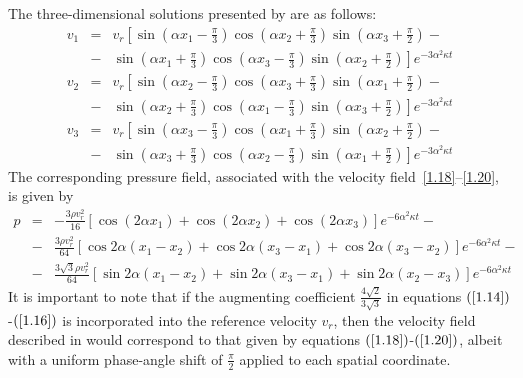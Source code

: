 \documentclass[11pt]{jfm}
\numberwithin{equation}{section}
\begin{document}
The three-dimensional solutions presented by \cite{tha4} are as follows:
\begin{eqnarray}
\label{1.18}
v_1& = &{v_r}\left[\sin { \left(\alpha x_1-\frac{\pi}{3} \right) } \cos {\left(\alpha x_2+\frac{\pi}{3}\right) }\sin { \left(\alpha x_3+\frac{\pi}{2}\right) }\right.- \nonumber\\
&-&\left.\sin  {\left( \alpha x_1+\frac{\pi}{3}\right) } \cos  { \left(\alpha x_3-\frac{\pi}{3} \right) } \sin  {\left( \alpha x_2+\frac{\pi}{2}\right) }\right]e^{ - 3\alpha ^2 \kappa t}
\end{eqnarray}
\begin{eqnarray}
\label{1.19}
v_2 & = &{v_r}\left[\sin { \left(\alpha x_2-\frac{\pi}{3} \right) } \cos {\left(\alpha x_3+\frac{\pi}{3}\right) }\sin { \left(\alpha x_1+\frac{\pi}{2}\right) }\right.- \nonumber\\
&-&\left.\sin  {\left( \alpha x_2+\frac{\pi}{3}\right) } \cos  { \left(\alpha x_1-\frac{\pi}{3} \right) } \sin  {\left( \alpha x_3+\frac{\pi}{2}\right) }\right]e^{ - 3\alpha ^2 \kappa t}
\end{eqnarray}
\begin{eqnarray}
\label{1.20}
v_3 &=&{v_r}\left[ \sin { \left(\alpha x_3-\frac{\pi}{3} \right) } \cos {\left(\alpha x_1+\frac{\pi}{3}\right) }\sin { \left(\alpha x_2+\frac{\pi}{2}\right) }\right.- \nonumber\\
&-&\left.\sin  {\left( \alpha x_3+\frac{\pi}{3}\right) } \cos  { \left(\alpha x_2-\frac{\pi}{3} \right) } \sin  {\left( \alpha x_1+\frac{\pi}{2}\right) }\right]e^{ - 3\alpha ^2 \kappa t}
\end{eqnarray}
The corresponding pressure field, associated with the velocity field~\eqref{1.18}--\eqref{1.20}, is given by
\begin{eqnarray}
\label{1.21}
p&=&-\frac{3\rho {v_r^2} }{16}\left[\cos\left(2\alpha x_1 \right)+\cos\left(2\alpha x_2 \right)+\cos\left(2\alpha x_3 \right)\right]e^{ - 6\alpha ^2 \kappa t}- \nonumber\\
&-&\frac{3\rho{v_r^2}}{64}\left[\cos 2\alpha\left(x_1-x_2\right)+\cos 2\alpha\left(x_3-x_1\right)+\cos 2\alpha\left(x_3-x_2\right)\right]e^{ - 6\alpha ^2 \kappa t}- \nonumber\\
&-&\frac{3\sqrt{3}\rho{v_r^2} }{64}\left[\sin 2\alpha\left(x_1-x_2\right)+\sin 2\alpha\left(x_3-x_1\right)+\sin 2\alpha\left(x_2-x_3\right)\right]e^{ - 6\alpha ^2 \kappa t}\qquad\quad
\end{eqnarray}
It is important to note that if the augmenting coefficient $\frac{4\sqrt{2}}{3\sqrt{3}}$ in equations $\left(\ref{1.14}\right)$-$\left(\ref{1.16}\right)$ is incorporated into the reference velocity $v_r$, then the velocity field described in \cite{ant} would correspond to that given by equations $\left(\ref{1.18}\right)$-$\left(\ref{1.20}\right)$, albeit with a uniform phase-angle shift of $\frac{\pi}{2}$ applied to each spatial coordinate.
\end{document}

